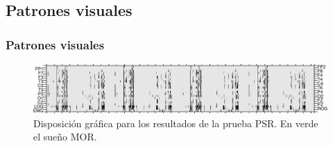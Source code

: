 \documentclass{beamer}
\begin{document}

\subsection{Patrones visuales}

\begin{frame}\frametitle{Patrones visuales}
\begin{figure}
\includegraphics[width=\textwidth]
{./img_ejemplos/MJNNVIGILOS_est.png}
\caption{Disposici\'on gr\'afica para los resultados de la prueba PSR. En verde el sue\~no MOR.}
\end{figure}
\end{frame}

\end{document}
